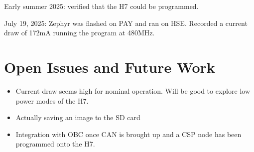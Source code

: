 \documentclass[12pt,a4paper]{article}
\begin{document}
    Early summer 2025: verified that the H7 could be programmed. 

    July 19, 2025: Zephyr was flashed on PAY and ran on HSE. Recorded a current 
    draw of 172mA running the program at 480MHz. 
    

    \section{Open Issues and Future Work}

    \begin{itemize}
        \item Current draw seems high for nominal operation. Will be good to explore low power modes of the H7. 
        \item Actually saving an image to the SD card
        \item Integration with OBC once CAN is brought up and a CSP node has been programmed onto the H7. 
    \end{itemize}


    \printbibliography
    
            
    \newpage


\end{document}
